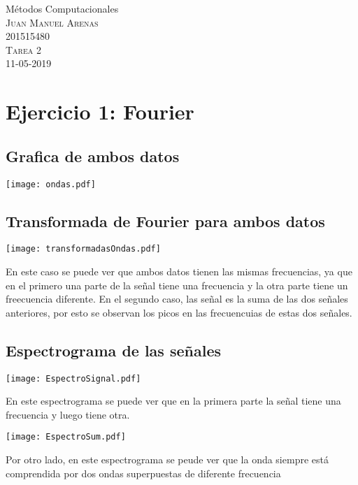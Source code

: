 \documentclass[11pt,letterpaper]{exam}
\begin{document}
\begin{center}
{\Large Métodos Computacionales} \\
\textsc{Juan Manuel Arenas}\\
\textsc{201515480}\\
\textsc{Tarea 2}\\
11-05-2019\\
\end{center}

\noindent
\section{Ejercicio 1: Fourier}

\subsection{Grafica de ambos datos}
\begin{center}
\texttt{[image: ondas.pdf]}
\end{center}

\subsection{Transformada de Fourier para ambos datos}
\begin{center}
\texttt{[image: transformadasOndas.pdf]}
\end{center}
En este caso se puede ver que ambos datos tienen las mismas frecuencias, ya que en el primero una parte de la señal tiene una frecuencia y la otra parte tiene un freecuencia diferente. En el segundo caso, las señal es la suma de las dos señales anteriores, por esto se observan los picos en las frecuencuias de estas dos señales.

\subsection{Espectrograma de las señales}
\begin{center}
\texttt{[image: EspectroSignal.pdf]}
\end{center}
En este espectrograma se puede ver que en la primera parte la señal tiene una frecuencia y luego tiene otra.
\begin{center}
\texttt{[image: EspectroSum.pdf]}
\end{center}
Por otro lado, en este espectrograma se peude ver que la onda siempre está comprendida por dos ondas superpuestas de diferente frecuencia
\end{document}
